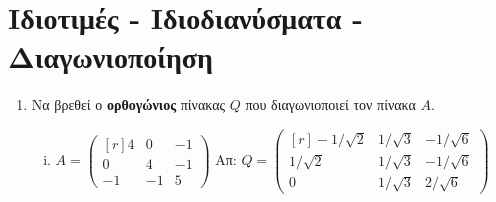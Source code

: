 \documentclass[a4paper,table]{report}
\begin{document}
\section*{Ιδιοτιμές - Ιδιοδιανύσματα - Διαγωνιοποίηση}


\begin{enumerate}
  \item Να βρεθεί ο \textbf{ορθογώνιος} πίνακας $Q$ που διαγωνιοποιεί τον πίνακα $A$. 

    \begin{enumerate}[i)]
      \item $ A = 
        \begin{pmatrix*}[r]
          4 & 0 & -1 \\
          0 & 4 & -1 \\
          -1 & -1 & 5
        \end{pmatrix*} $ \hfill Απ: $ Q = 
        \begin{pmatrix*}[r]
          -1/ \sqrt{2} & 1 / \sqrt{3} & - 1 / \sqrt{6} \\ 
          1/ \sqrt{2} & 1 / \sqrt{3} & - 1 / \sqrt{6} \\ 
          0 & 1 / \sqrt{3} &  2 / \sqrt{6} 
        \end{pmatrix*} $ 
    \end{enumerate}

\end{enumerate}
\end{document}
